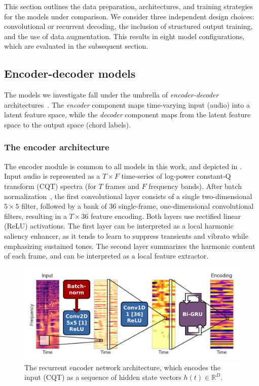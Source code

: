 \documentclass{article}
\begin{document}

This section outlines the data preparation, architectures, and training strategies for the models under comparison.
We consider three independent design choices: convolutional or recurrent decoding, the inclusion of structured output training, and the use of data augmentation.
This results in eight model configurations, which are evaluated in the subsequent section.

\subsection{Encoder-decoder models}

The models we investigate fall under the umbrella of \emph{encoder-decoder} architectures~\cite{cho2015describing}.
The \emph{encoder} component maps time-varying input (audio) into a latent feature space, while the \emph{decoder} component maps from the latent feature space to the output space (chord labels).

\subsubsection{The encoder architecture}
The encoder module is common to all models in this work, and depicted in .
Input audio is represented as a $T\times F$ time-series of log-power constant-Q transform (CQT) spectra (for $T$ frames and $F$ frequency bands).
After batch normalization~\cite{ioffe2015batch}, the first convolutional layer consists of a single two-dimensional $5\times5$ filter, followed by a bank of $36$ single-frame, one-dimensional convolutional filters, resulting in a $T\times 36$ feature encoding.
Both layers use rectified linear (ReLU) activations.
The first layer can be interpreted as a local harmonic saliency enhancer, as it tends to learn to suppress transients and vibrato while emphasizing sustained tones.
The second layer summarizes the harmonic content of each frame, and can be interpreted as a local feature extractor.

\begin{figure}[t]
    \centering
    \includegraphics[width=\columnwidth]{encoder-r}
    \caption{The recurrent encoder network architecture, which encodes the input (CQT) as a sequence of hidden state vectors $h(t) \in \mathbb{R}^D$.\label{fig:encoder}}
\end{figure}
\end{document}
